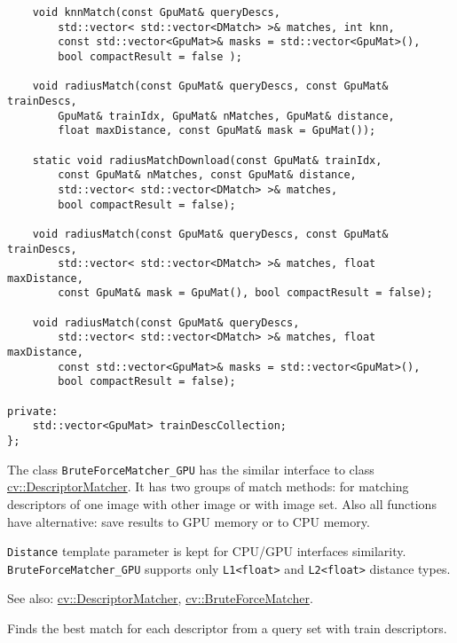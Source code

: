 \begin{lstlisting}
    void knnMatch(const GpuMat& queryDescs, 
        std::vector< std::vector<DMatch> >& matches, int knn,
        const std::vector<GpuMat>& masks = std::vector<GpuMat>(), 
        bool compactResult = false );

    void radiusMatch(const GpuMat& queryDescs, const GpuMat& trainDescs,
        GpuMat& trainIdx, GpuMat& nMatches, GpuMat& distance, 
        float maxDistance, const GpuMat& mask = GpuMat());

    static void radiusMatchDownload(const GpuMat& trainIdx, 
        const GpuMat& nMatches, const GpuMat& distance, 
        std::vector< std::vector<DMatch> >& matches, 
        bool compactResult = false);

    void radiusMatch(const GpuMat& queryDescs, const GpuMat& trainDescs,
        std::vector< std::vector<DMatch> >& matches, float maxDistance,
        const GpuMat& mask = GpuMat(), bool compactResult = false);

    void radiusMatch(const GpuMat& queryDescs, 
        std::vector< std::vector<DMatch> >& matches, float maxDistance,
        const std::vector<GpuMat>& masks = std::vector<GpuMat>(), 
        bool compactResult = false);

private:
    std::vector<GpuMat> trainDescCollection;
};
\end{lstlisting}

The class \texttt{BruteForceMatcher\_GPU} has the similar interface to class \hyperref[cv.class.DescriptorMatcher]{cv::DescriptorMatcher}. It has two groups of match methods: for matching descriptors of one image with other image or with image set. Also all functions have alternative: save results to GPU memory or to CPU memory.

\texttt{Distance} template parameter is kept for CPU/GPU interfaces similarity. \texttt{BruteForceMatcher\_GPU} supports only \texttt{L1<float>} and \texttt{L2<float>} distance types.

See also: \hyperref[cv.class.DescriptorMatcher]{cv::DescriptorMatcher}, \hyperref[cv.class.BruteForceMatcher]{cv::BruteForceMatcher}.


\label{cppfunc.gpu.BruteForceMatcher.match}
Finds the best match for each descriptor from a query set with train descriptors.


